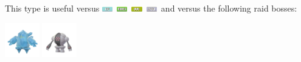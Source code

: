 \documentclass[12pt]{beamer}
\newcommand{\bugfull}{\includegraphics[height=0.2cm]{../../images/type/full/Bug.png}}
\newcommand{\grassfull}{\includegraphics[height=0.2cm]{../../images/type/full/Grass.png}}
\newcommand{\icefull}{\includegraphics[height=0.2cm]{../../images/type/full/Ice.png}}
\newcommand{\steelfull}{\includegraphics[height=0.2cm]{../../images/type/full/Steel.png}}
\begin{document}
\begin{frame}
\begin{footnotesize}
\begin{block}{}\begin{center}
This type is useful versus \icefull~\grassfull~\bugfull~\steelfull~and versus the following raid bosses:

    \includegraphics[width=1.5cm]{../../images/pokemon/regice}
    \includegraphics[width=1.5cm]{../../images/pokemon/registeel}
\end{center}
\end{block}

\end{footnotesize}
\end{frame}



\end{document}
